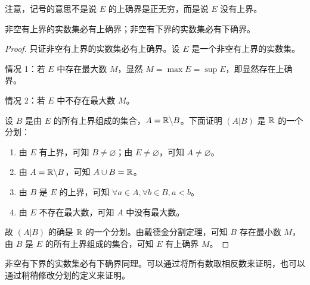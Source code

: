 注意，记号的意思不是说 $E$ 的上确界是正无穷，而是说 $E$ 没有上界。

\begin{theorem}[确界存在定理]
	非空有上界的实数集必有上确界；非空有下界的实数集必有下确界。
\end{theorem}

\begin{proof}
	只证非空有上界的实数集必有上确界。设 $E$ 是一个非空有上界的实数集。

	情况 1：若 $E$ 中存在最大数 $M$，显然 $M = \max E = \sup E$，即显然存在上确界。

	情况 2：若 $E$ 中不存在最大数 $M$。

	设 $B$ 是由 $E$ 的所有上界组成的集合，$A = \mathbb R \backslash B$。下面证明 $(A | B)$ 是 $\mathbb R$ 的一个分划：

	\begin{enumerate}
		\item 由 $E$ 有上界，可知 $B \ne \varnothing$；由 $E \ne \varnothing$，可知 $A \ne \varnothing$。
		\item 由 $A = \mathbb R \backslash B$，可知 $A \cup B = \mathbb R$。
		\item 由 $B$ 是 $E$ 的上界，可知 $\forall a \in A, \forall b \in B, a < b$。
		\item 由 $E$ 不存在最大数，可知 $A$ 中没有最大数。
	\end{enumerate}

	故 $(A | B)$ 的确是 $\mathbb R$ 的一个分划。由戴德金分割定理，可知 $B$ 存在最小数 $M$，由 $B$ 是 $E$ 的所有上界组成的集合，可知 $E$ 有上确界 $M$。
\end{proof}

非空有下界的实数集必有下确界同理。可以通过将所有数取相反数来证明，也可以通过稍稍修改分划的定义来证明。